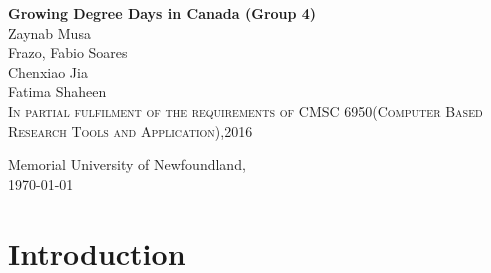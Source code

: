 \documentclass[12pt]{article}
\begin{document}
\begin{titlepage}
	\begin{center}
	
	
	{\Large \bf
Growing Degree Days in Canada (Group 4) \\

\vspace*{0.4in}
}
Zaynab Musa\\ 
Frazo, Fabio Soares\\
Chenxiao Jia\\
Fatima Shaheen\\

\vspace*{0.4in}  
\textsc{\small In partial fulfilment of the requirements of CMSC 6950(Computer Based Research Tools and Application),2016}

\end{center}
\vspace*{5.0in}
\begin{flushleft}
{\textsc Memorial University of Newfoundland,} \\
\today
\end{flushleft}
\end{titlepage}

\newpage
\begin{abstract}
Growing Degree Days (GDDs) are used to estimate the growth and development of plants and insects during the growing season. Heat units expressed in growing degree days(GDDs) are frequently used to describe the timing of biological process

The objective of this paper is to calculate the GDD for selected cities in Canada. We  also provide a visual representation of the accumulated GDD for selected cities in Canada over a given period.A visual examination of the annual cycle of minimum and maximum daily temperatures for canadian cities is explored.


 Finally, we explore how the GDD calculation depends on the base temperature for selected cities in Canada.\\



 Keywords -- {\bf Growing Degree Days(GDDs)}


\end{abstract}
\newpage
\tableofcontents
\newpage
\section{ \bf Introduction}
\end{document}

